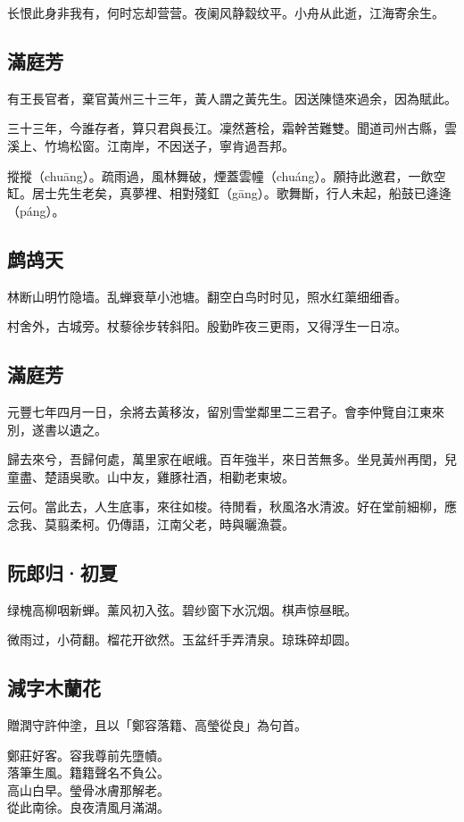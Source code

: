 \documentclass[a5paper]{ctexart}
\begin{document}
	长恨此身非我有，何时忘却营营。夜阑风静縠纹平。小舟从此逝，江海寄余生。
	
	\subsection{滿庭芳}
	\begin{small}
		有王長官者，棄官黃州三十三年，黃人謂之黃先生。因送陳慥來過余，因為賦此。
	\end{small}
	
	三十三年，今誰存者，算只君與長江。凜然蒼桧，霜幹苦難雙。聞道司州古縣，雲溪上、竹塢松窗。江南岸，不因送子，寧肯過吾邦。
	
	摐摐（chuāng）。疏雨過，風林舞破，煙蓋雲幢（chuáng）。願持此邀君，一飲空缸。居士先生老矣，真夢裡、相對殘釭（gāng）。歌舞斷，行人未起，船鼓已逄逄（páng）。
	
	\subsection{鹧鸪天}
	林断山明竹隐墙。乱蝉衰草小池塘。翻空白鸟时时见，照水红蕖细细香。
	
	村舍外，古城旁。杖藜徐步转斜阳。殷勤昨夜三更雨，又得浮生一日凉。
	
	\subsection{滿庭芳}
	\begin{small}
		元豐七年四月一日，余將去黃移汝，留別雪堂鄰里二三君子。會李仲覽自江東來別，遂書以遺之。
	\end{small}
	
	歸去來兮，吾歸何處，萬里家在岷峨。百年強半，來日苦無多。坐見黃州再閏，兒童盡、楚語吳歌。山中友，雞豚社酒，相勸老東坡。
	
	云何。當此去，人生底事，來往如梭。待閒看，秋風洛水清波。好在堂前細柳，應念我、莫翦柔柯。仍傳語，江南父老，時與曬漁蓑。
	
	\subsection{阮郎归·初夏}
	绿槐高柳咽新蝉。薰风初入弦。碧纱窗下水沉烟。棋声惊昼眠。
	
	微雨过，小荷翻。榴花开欲然。玉盆纤手弄清泉。琼珠碎却圆。
	
	\subsection{減字木蘭花}
	\begin{small}
		贈潤守許仲塗，且以「鄭容落籍、高瑩從良」為句首。
	\end{small}
	\begin{center}
		鄭莊好客。容我尊前先墮幘。\\
		落筆生風。籍籍聲名不負公。\\
		高山白早。瑩骨冰膚那解老。\\
		從此南徐。良夜清風月滿湖。
	\end{center}	
	
\end{document}
